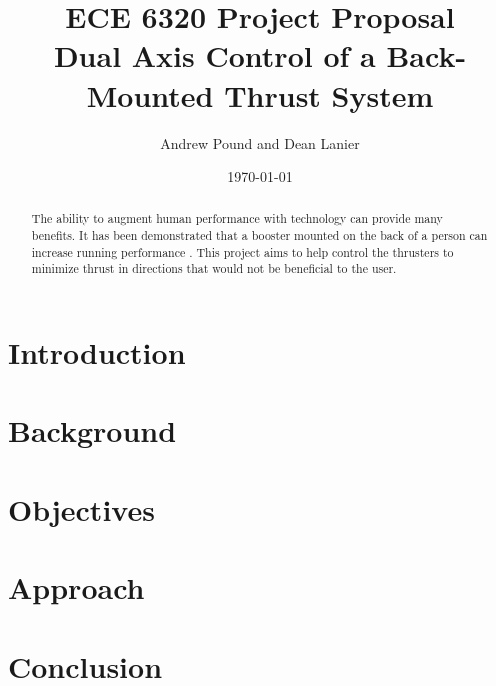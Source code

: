 \documentclass[10pt]{article}
\title{ECE 6320 Project Proposal\\
  Dual Axis Control of a Back-Mounted Thrust System
}
\author{Andrew Pound and Dean Lanier}
\date{\today}
\begin{document}
\maketitle

\begin{abstract}
The ability to augment human performance with technology can provide
many benefits.  It has been demonstrated that a booster mounted on the
back of a person can increase running performance \cite{sugar2014systems}.  This
project aims to help control the thrusters to minimize thrust in
directions that would not be beneficial to the user.

\end{abstract}


\section{Introduction}%

\section{Background}

\section{Objectives}

\section{Approach}

\section{Conclusion}



% 
\end{document}
